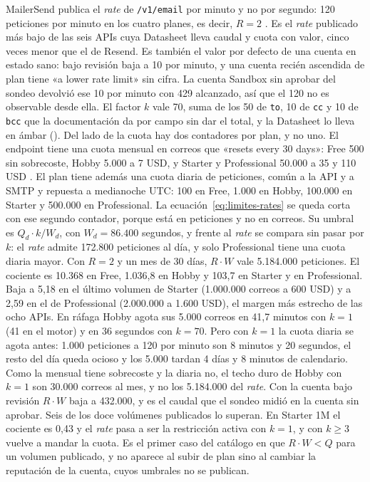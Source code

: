 MailerSend publica el \textit{rate} de \texttt{/v1/email} por minuto y no por segundo: 120 peticiones por minuto en los cuatro planes, es decir, $R = 2$ \citep{mailersenddocs}.
Es el \textit{rate} publicado más bajo de las seis APIs cuya Datasheet lleva caudal y cuota con valor, cinco veces menor que el de Resend.
Es también el valor por defecto de una cuenta en estado sano: bajo revisión baja a 10 por minuto, y una cuenta recién ascendida de plan tiene «a lower rate limit» sin cifra.
La cuenta Sandbox sin aprobar del sondeo devolvió ese 10 por minuto con 429 alcanzado, así que el 120 no es observable desde ella.
El factor $k$ vale 70, suma de los 50 de \texttt{to}, 10 de \texttt{cc} y 10 de \texttt{bcc} que la documentación da por campo sin dar el total, y la Datasheet lo lleva en ámbar (\semambar{}).
Del lado de la cuota hay dos contadores por plan, y no uno.
El endpoint tiene una cuota mensual en correos que «resets every 30 days»: Free 500 sin sobrecoste, Hobby 5.000 a 7 USD, y Starter y Professional 50.000 a 35 y 110 USD \citep{mailersendpricing}.
El plan tiene además una cuota diaria de peticiones, común a la API y a SMTP y repuesta a medianoche UTC: 100 en Free, 1.000 en Hobby, 100.000 en Starter y 500.000 en Professional.
La ecuación~\ref{eq:limites-rates} se queda corta con ese segundo contador, porque está en peticiones y no en correos.
Su umbral es $Q_d \cdot k / W_d$, con $W_d = 86.400$ segundos, y frente al \textit{rate} se compara sin pasar por $k$: el \textit{rate} admite 172.800 peticiones al día, y solo Professional tiene una cuota diaria mayor.
Con $R = 2$ y un mes de 30 días, $R \cdot W$ vale 5.184.000 peticiones.
El cociente es 10.368 en Free, 1.036,8 en Hobby y 103,7 en Starter y en Professional.
Baja a 5,18 en el último volumen de Starter (1.000.000 correos a 600 USD) y a 2,59 en el de Professional (2.000.000 a 1.600 USD), el margen más estrecho de las ocho APIs.
En ráfaga Hobby agota sus 5.000 correos en 41,7 minutos con $k = 1$ (41 en el motor) y en 36 segundos con $k = 70$.
Pero con $k = 1$ la cuota diaria se agota antes: 1.000 peticiones a 120 por minuto son 8 minutos y 20 segundos, el resto del día queda ocioso y los 5.000 tardan 4 días y 8 minutos de calendario.
Como la mensual tiene sobrecoste y la diaria no, el techo duro de Hobby con $k = 1$ son 30.000 correos al mes, y no los 5.184.000 del \textit{rate}.
Con la cuenta bajo revisión $R \cdot W$ baja a 432.000, y es el caudal que el sondeo midió en la cuenta sin aprobar. Seis de los doce volúmenes publicados lo superan.
En Starter 1M el cociente es 0,43 y el \textit{rate} pasa a ser la restricción activa con $k = 1$, y con $k \geq 3$ vuelve a mandar la cuota.
Es el primer caso del catálogo en que $R \cdot W < Q$ para un volumen publicado, y no aparece al subir de plan sino al cambiar la reputación de la cuenta, cuyos umbrales no se publican.


